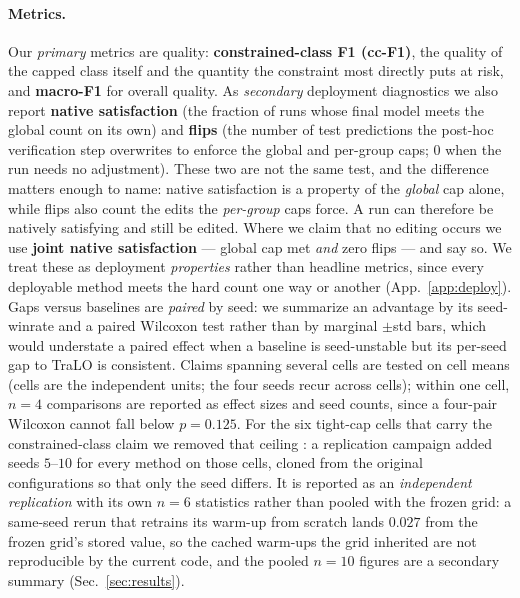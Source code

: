 \documentclass[10pt]{article}
\begin{document}
\paragraph{Metrics.}
Our \emph{primary} metrics are quality: \textbf{constrained-class F1
(cc-F1)}, the quality of the capped class itself and the quantity the
constraint most directly puts at risk, and \textbf{macro-F1} for overall
quality. As \emph{secondary} deployment diagnostics we also report
\textbf{native satisfaction} (the fraction of runs whose final model meets
the global count {on its own}) and
\textbf{flips} (the number of
test predictions the post-hoc verification step overwrites to enforce the
global and per-group caps; $0$ when the run needs no adjustment).
{These two are not the same test, and the difference matters enough
to name: native satisfaction is a property of the \emph{global} cap alone, while
flips also count the edits the \emph{per-group} caps force. A run can therefore
be natively satisfying and still be edited. Where we claim that no editing
occurs we use \textbf{joint native satisfaction} --- global cap met \emph{and}
zero flips --- and say so.} We treat
these as deployment \emph{properties} rather than headline metrics, since
every deployable method meets the hard count one way or another
(App.~\ref{app:deploy}). Gaps versus baselines are \emph{paired} by seed:
{we
summarize an advantage by its seed-winrate and a paired Wilcoxon test rather
than by marginal $\pm$std bars, which would understate a paired effect when a
baseline is seed-unstable but its per-seed gap to TraLO is consistent.} Claims spanning
several cells are tested on cell means (cells are the independent units;
the four seeds recur across cells); within one cell, $n{=}4$ comparisons
are reported as effect sizes and seed counts, since a four-pair Wilcoxon
cannot fall below $p{=}0.125$.{ For the six tight-cap cells that
carry the constrained-class claim we removed that ceiling : a replication campaign added seeds $5$--$10$ for every method on
those cells, cloned from the original configurations so that only the seed
differs. {It is reported as an} \emph{independent replication} with its own $n{=}6$
statistics rather than {pooled with} the frozen grid{:} a same-seed rerun that retrains its
warm-up from scratch lands $0.027$ from the frozen grid's stored value, so the
cached warm-ups the grid inherited are not reproducible by the current code{, and the pooled $n{=}10$ figures
are a secondary summary (Sec.~\ref{sec:results}).}}
\end{document}
